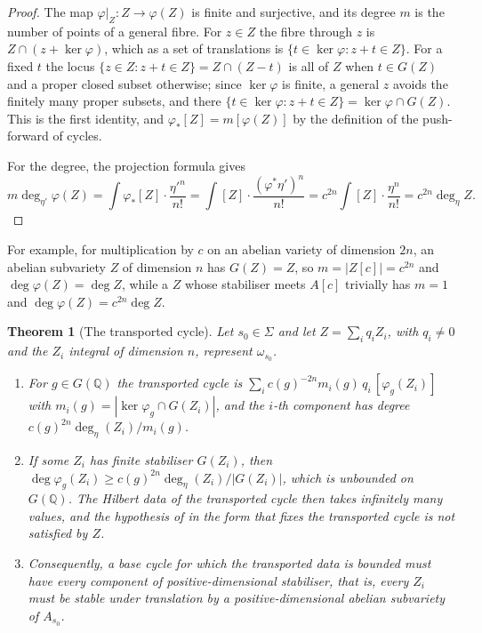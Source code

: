 \documentclass[11pt,reqno]{amsart}
\theoremstyle{plain}
\newtheorem{theorem}{Theorem}[section]
\theoremstyle{definition}
\theoremstyle{remark}
\newcommand{\QQ}{\mathbb{Q}}
\begin{document}
\begin{proof}
The map $\varphi|_{Z}\colon Z\to\varphi(Z)$ is finite and surjective, and its
degree $m$ is the number of points of a general fibre. For $z\in Z$ the fibre
through $z$ is $Z\cap(z+\ker\varphi)$, which as a set of translations is
$\{t\in\ker\varphi:z+t\in Z\}$. For a fixed $t$ the locus
$\{z\in Z:z+t\in Z\}=Z\cap(Z-t)$ is all of $Z$ when $t\in G(Z)$ and a proper
closed subset otherwise; since $\ker\varphi$ is finite, a general $z$ avoids
the finitely many proper subsets, and there
$\{t\in\ker\varphi:z+t\in Z\}=\ker\varphi\cap G(Z)$. This is the first
identity, and $\varphi_{*}[Z]=m[\varphi(Z)]$ by the definition of the
push-forward of cycles.

For the degree, the projection formula gives
\[
  m\deg_{\eta'}\varphi(Z)=\int\varphi_{*}[Z]\cdot\frac{\eta'^{n}}{n!}
  =\int[Z]\cdot\frac{(\varphi^{*}\eta')^{n}}{n!}
  =c^{2n}\int[Z]\cdot\frac{\eta^{n}}{n!}=c^{2n}\deg_{\eta}Z .
\]
\end{proof}

For example, for multiplication by $c$ on an abelian variety of dimension $2n$,
an abelian subvariety $Z$ of dimension $n$ has $G(Z)=Z$, so $m=|Z[c]|=c^{2n}$
and $\deg\varphi(Z)=\deg Z$, while a $Z$ whose stabiliser meets $A[c]$
trivially has $m=1$ and $\deg\varphi(Z)=c^{2n}\deg Z$.

\begin{theorem}[The transported cycle]\label{thm:p1forces}
Let $s_{0}\in\Sigma$ and let $Z=\sum_{i}q_{i}Z_{i}$, with $q_{i}\ne0$ and the
$Z_{i}$ integral of dimension $n$, represent $\omega_{s_{0}}$.
\begin{enumerate}[label=\textup{(\roman*)},leftmargin=2.6em,itemsep=2pt]
\item For $g\in G(\QQ)$ the transported cycle is
  $\sum_{i}c(g)^{-2n}m_{i}(g)\,q_{i}\,[\varphi_{g}(Z_{i})]$ with
  $m_{i}(g)=|\ker\varphi_{g}\cap G(Z_{i})|$, and the $i$-th component has
  degree $c(g)^{2n}\deg_{\eta}(Z_{i})/m_{i}(g)$.
\item If some $Z_{i}$ has finite stabiliser $G(Z_{i})$, then
  $\deg\varphi_{g}(Z_{i})\ge c(g)^{2n}\deg_{\eta}(Z_{i})/|G(Z_{i})|$, which is
  unbounded on $G(\QQ)$. The Hilbert data of the transported cycle then takes
  infinitely many values, and the hypothesis of  in the
  form that fixes the transported cycle is not satisfied by $Z$.
\item Consequently, a base cycle for which the transported data is bounded
  must have every component of positive-dimensional stabiliser, that is, every
  $Z_{i}$ must be stable under translation by a positive-dimensional abelian
  subvariety of $A_{s_{0}}$.
\end{enumerate}
\end{theorem}
\end{document}
